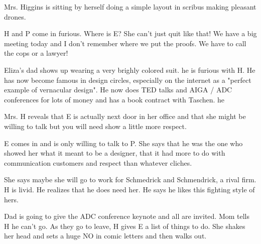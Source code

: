 \act


Mrs. Higgins is sitting by herself doing a simple layout in scribus making pleasant drones.

H and P come in furious.  Where is E?  She can't just quit like that!  We have a big meeting today and I don't remember where we put the proofs.  We have to call the cops or a lawyer!

Eliza's dad shows up wearing a very brighly colored suit.  he is furious with H.  He has now become famous in design circles, especially on the internet as a "perfect example of vernacular design".  He now does TED talks and AIGA / ADC conferences for lots of money and has a book contract with Taschen.  he 

Mrs. H reveals that E is actually next door in her office and that she might be willing to talk but you will need show a little more respect.  

E comes in and is only willing to talk to P.  She says that he was the one who showed her what it meant to be a designer, that it had more to do with communication customers and respect than whatever cliches.

She says maybe she will go to work for Schmedrick and Schmendrick, a rival firm.  H is livid. He realizes that he does need her.  He says he likes this fighting style of hers.

Dad is going to give the ADC conference keynote and all are invited.  Mom tells H he can't go. As they go to leave, H gives E a list of things to do.  She shakes her head and sets a huge NO in comic letters and then walks out.

